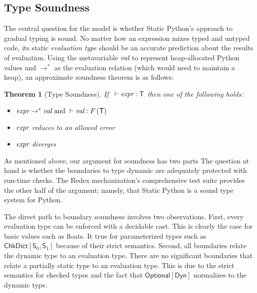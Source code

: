 \documentclass[english,cleveref,submission]{programming}
\newcommand{\SP}{Static Python}
\newcommand{\code}[1]{\texttt{#1}}
\newcommand{\spapp}[2]{#1\,(#2)}
\newcommand{\spann}[2]{#1\!:\!#2}
\newcommand{\typefont}[1]{\mathsf{#1}}
\newcommand{\codefont}[1]{\emph{#1}}
\newcommand{\paramtype}[2]{#1[#2]}
\newcommand{\sptype}{\typefont{T}}
\newcommand{\spteval}{\typefont{S}}
\newcommand{\sptclass}{\typefont{C}}
\newcommand{\sptdyn}{\typefont{Dyn}}
\newcommand{\sptoptional}[1]{\paramtype{\typefont{Optional}}{#1}}
\newcommand{\sptchkdict}[2]{\paramtype{\typefont{ChkDict}}{#1, #2}}
\newcommand{\sptenv}{\typefont{Env}}
\newcommand{\sptvardef}[2]{\spann{#1}{#2}}
\newcommand{\spx}{\code{x}}
\newcommand{\spf}{\code{f}}
\newcommand{\spc}{\sptclass}
\newcommand{\spexpr}{\codefont{expr}}
\newcommand{\spvalue}{\codefont{val}}
\newcommand{\vdashsub}[1]{\vdash_{#1}}
\newcommand{\wtprog}{\vdashsub{\mathbf{P}}}
\newcommand{\wtexpr}{\vdashsub{\mathbf{E}}}
\newcommand{\spvardef}[3]{\sptvardef{#1}{#2} = #3}
\newcommand{\spfundef}[4]{\mathrm{def}~\spapp{#1}{#2}\code{ -> }#3: #4}
\newcommand{\spclassdef}[4]{\mathrm{class}~\spapp{#1}{#2}:~#3;~#4}
\newcommand{\spself}{\code{self}}
\newcommand{\sprred}{\rightarrow^*}
\newcommand{\mfapply}[2]{#1\,(#2)}
\newcommand{\mffont}[1]{\mathit{#1}}
\newcommand{\mftypeF}[1]{\mfapply{\mffont{F}}{#1}} %
\newtheorem{theorem}{Theorem}
\begin{document}
%


\subsection{Type Soundness}

The central question for the model is whether \SP{}'s approach to gradual typing
is sound.
No matter how an expression mixes typed and untyped code, its static
\emph{evaluation type} should be an accurate prediction about the results
of evaluation.
Using the metavariable $\spvalue$ to represent heap-allocated Python values
and $\sprred$ as the evaluation relation (which would need to maintain a heap),
an approximate soundness theorem is as follows:

\begin{theorem}[Type Soundness]
  If\ \(~\vdash \spexpr : \sptype\)
  then one of the following holds:
  \begin{itemize}
    \item
      \(\spexpr \sprred \spvalue
        \mbox{ and }
        \vdash \spvalue : \mftypeF{\sptype}
      \)
    \item
      \(\spexpr\) reduces to an allowed error
    \item
      \(\spexpr\) diverges
  \end{itemize}
\end{theorem}

As mentioned above, our argument for soundness has two parts
The question at hand is whether the boundaries to type dynamic
are adequately protected with run-time checks.
The Redex mechanization's comprehensive test suite provides the other half of the
argument; namely, that \SP{} is a sound type system for Python.

The direct path to boundary soundness involves two observations.
First, every evaluation type can be enforced with a decidable cast.
This is clearly the case for basic values such as floats.
It true for parameterized types such as $\sptchkdict{\spteval_0}{\spteval_1}$
because of their strict semantics.
Second, all boundaries relate the dynamic type to an evaluation type.
There are no significant boundaries that relate a partially static type
to an evaluation type.
This is due to the strict semantics for checked types and the fact that
$\sptoptional{\sptdyn}$ normalizes to the dynamic type.
\end{document}
